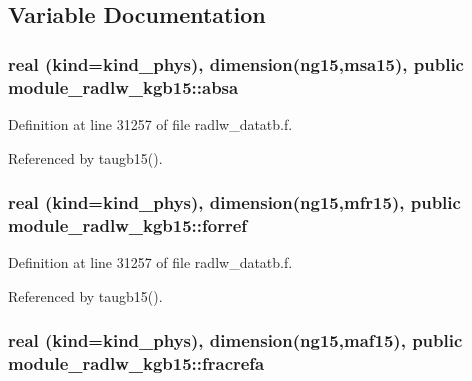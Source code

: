 \subsection{Variable Documentation}
\subsubsection[{\texorpdfstring{absa}{absa}}]{\setlength{\rightskip}{0pt plus 5cm}real (kind=kind\+\_\+phys), dimension(ng15,{\bf msa15}), public module\+\_\+radlw\+\_\+kgb15\+::absa}\hypertarget{namespacemodule__radlw__kgb15_aa6412ac501e2afed3d1b64b0cdcdab9e}{}\label{namespacemodule__radlw__kgb15_aa6412ac501e2afed3d1b64b0cdcdab9e}


Definition at line 31257 of file radlw\+\_\+datatb.\+f.



Referenced by taugb15().

\subsubsection[{\texorpdfstring{forref}{forref}}]{\setlength{\rightskip}{0pt plus 5cm}real (kind=kind\+\_\+phys), dimension(ng15,{\bf mfr15}), public module\+\_\+radlw\+\_\+kgb15\+::forref}\hypertarget{namespacemodule__radlw__kgb15_ada70146d20f89f059141aa4cf58a0894}{}\label{namespacemodule__radlw__kgb15_ada70146d20f89f059141aa4cf58a0894}


Definition at line 31257 of file radlw\+\_\+datatb.\+f.



Referenced by taugb15().

\subsubsection[{\texorpdfstring{fracrefa}{fracrefa}}]{\setlength{\rightskip}{0pt plus 5cm}real (kind=kind\+\_\+phys), dimension(ng15,{\bf maf15}), public module\+\_\+radlw\+\_\+kgb15\+::fracrefa}\hypertarget{namespacemodule__radlw__kgb15_a4b5c5f6fd9ea806843adf78ec1b43cd2}{}\label{namespacemodule__radlw__kgb15_a4b5c5f6fd9ea806843adf78ec1b43cd2}


